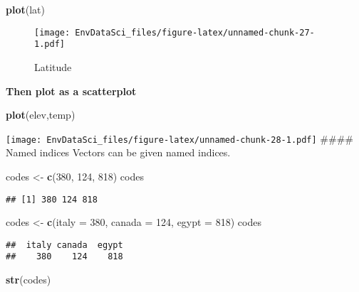 \documentclass[
]{book}
\newenvironment{Shaded}{\begin{snugshade}}{\end{snugshade}}
\newcommand{\DataTypeTok}[1]{\textcolor[rgb]{0.13,0.29,0.53}{#1}}
\newcommand{\DecValTok}[1]{\textcolor[rgb]{0.00,0.00,0.81}{#1}}
\newcommand{\KeywordTok}[1]{\textcolor[rgb]{0.13,0.29,0.53}{\textbf{#1}}}
\newcommand{\NormalTok}[1]{#1}
\newcommand{\StringTok}[1]{\textcolor[rgb]{0.31,0.60,0.02}{#1}}
\begin{document}
\begin{Shaded}
\begin{Highlighting}[]
\KeywordTok{plot}\NormalTok{(lat)}
\end{Highlighting}
\end{Shaded}

\begin{figure}
\centering
\texttt{[image: EnvDataSci\_files/figure-latex/unnamed-chunk-27-1.pdf]}
\caption{\label{fig:unnamed-chunk-27}Latitude}
\end{figure}

\textbf{Then plot as a scatterplot}

\begin{Shaded}
\begin{Highlighting}[]
\KeywordTok{plot}\NormalTok{(elev,temp)}
\end{Highlighting}
\end{Shaded}

\texttt{[image: EnvDataSci\_files/figure-latex/unnamed-chunk-28-1.pdf]}
\#\#\#\# Named indices
Vectors can be given named indices.

\begin{Shaded}
\begin{Highlighting}[]
\NormalTok{codes <-}\StringTok{ }\KeywordTok{c}\NormalTok{(}\DecValTok{380}\NormalTok{, }\DecValTok{124}\NormalTok{, }\DecValTok{818}\NormalTok{)}
\NormalTok{codes}
\end{Highlighting}
\end{Shaded}

\begin{verbatim}
## [1] 380 124 818
\end{verbatim}

\begin{Shaded}
\begin{Highlighting}[]
\NormalTok{codes <-}\StringTok{ }\KeywordTok{c}\NormalTok{(}\DataTypeTok{italy =} \DecValTok{380}\NormalTok{, }\DataTypeTok{canada =} \DecValTok{124}\NormalTok{, }\DataTypeTok{egypt =} \DecValTok{818}\NormalTok{)}
\NormalTok{codes}
\end{Highlighting}
\end{Shaded}

\begin{verbatim}
##  italy canada  egypt 
##    380    124    818
\end{verbatim}

\begin{Shaded}
\begin{Highlighting}[]
\KeywordTok{str}\NormalTok{(codes)}
\end{Highlighting}
\end{Shaded}
\end{document}
